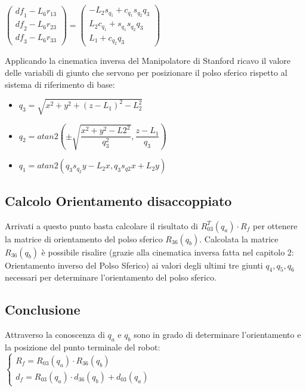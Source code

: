 \documentclass[a4paper,12pt]{article}
\begin{document}
\begin{center}
$\begin{pmatrix}{{\mathit{df}}_1}-{L_6} {r_{13}}\\
{{\mathit{df}}_2}-{L_6} {r_{23}}\\
{{\mathit{df}}_3}-{L_6} {r_{33}}\end{pmatrix}=\begin{pmatrix}-{L_2} {s_{{q_1}}}+{c_{{q_1}}} {s_{{q_2}}} {q_3}\\
{L_2} {c_{{q_1}}}+{s_{{q_1}}} {s_{{q_2}}} {q_3}\\
{L_1}+{c_{{q_2}}} {q_3}\end{pmatrix}$
\end{center}

Applicando la cinematica inversa del Manipolatore di Stanford ricavo il valore delle variabili di giunto che servono per posizionare il polso sferico rispetto al sistema di riferimento di base:
\begin{itemize}
\item $q_3 = \sqrt{x^2 +y^2+(z-L_1)^2-L_2^2}$
\item $q_2 = atan2(\pm\sqrt{\dfrac{x^2+y^2-L2^2}{q_3^2}},\dfrac{z-L_1}{q_3})$
\item $q_1 = atan2(q_3 s_{q_2}y-L_2x,q_3s_{q2}x+L_2y)$
\end{itemize}

\subsection{Calcolo Orientamento disaccoppiato}
Arrivati a questo punto basta calcolare il risultato di $ R_{03}^T(q_a) \cdot R_f $ per ottenere la matrice di orientamento del polso sferico $R_{36}(q_b)$. Calcolata la matrice $R_{36}(q_b)$ è possibile risalire (grazie alla cinematica inversa fatta nel capitolo 2: Orientamento inverso del Polso Sferico) ai valori degli ultimi tre giunti $q_4,q_5,q_6$ necessari per determinare l'orientamento del polso sferico.

\subsection{Conclusione}
Attraverso la conoscenza di $q_a$ e $q_b$ sono in grado di determinare l'orientamento e la posizione del punto terminale del robot:\\

		$\left\{ \begin{array} {ll} %
		R_f  = R_{03}(q_a) \cdot  R_{36}(q_b) \\
		d_f = R_{03}(q_a) \cdot d_{36}(q_b) + d_{03}(q_a)
		\end{array}
		\right.$
\end{document}
